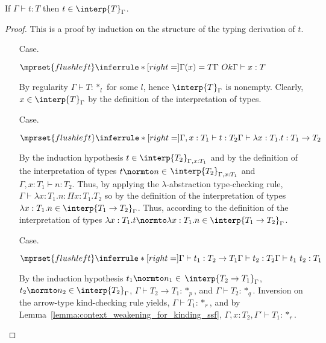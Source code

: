 \begin{thm}
  If $\Gamma \vdash t:T$ then $t \in \interp{T}_\Gamma$.
  \label{thm:soundness_ssf}
\end{thm}
\begin{proof}
  This is a proof by induction on the structure of the typing derivation of $t$.

\begin{itemize}
\item[Case.]\ \\
  \begin{center}
    \begin{math}
      $$\mprset{flushleft}
      \inferrule* [right=] {
        \Gamma(x) = T
        \\
        \Gamma\ Ok
      }{\Gamma \vdash x:T}
    \end{math}
  \end{center}
  By regularity $\Gamma \vdash T:*_l$ for some $l$, hence $\interp{T}_\Gamma$ is nonempty.
  Clearly, $x \in \interp{T}_\Gamma$ by the definition of the interpretation of types.
  
\item[Case.]\ \\
  \begin{center}
    \begin{math}
      $$\mprset{flushleft}
      \inferrule* [right=] {
        \Gamma,x:T_1 \vdash t:T_2
      }{\Gamma \vdash \lambda x:T_1.t : T_1 \rightarrow T_2}
    \end{math}
  \end{center}
  By the induction hypothesis $t \in
  \interp{T_2}_{\Gamma,x:T_1}$ and by the definition of the
  interpretation of types $t \normto n \in $ 
  $\interp{T_2}_{\Gamma,x:T_1}$ and $\Gamma, x:T_1 \vdash
  n:T_2$.  Thus, by applying the $\lambda$-abstraction type-checking
  rule, $\Gamma \vdash \lambda x:T_1.n:\Pi x:T_1.T_2$ so 
  by the definition of the interpretation of types $\lambda x:T_1.n
  \in \interp{T_1 \rightarrow T_2}_\Gamma$.  Thus, according to the
  definition of the interpretation of types $\lambda x:T_1.t
  \normto \lambda x:T_1.n \in \interp{T_1 \rightarrow T_2}_\Gamma$.

\item[Case.]\ \\
  \begin{center}
    \begin{math}
      $$\mprset{flushleft}
      \inferrule* [right=] {
        \Gamma \vdash t_1 : T_2 \rightarrow T_1 
        \\
        \Gamma \vdash t_2 : T_2
      }{\Gamma \vdash t_1\ t_2 : T_1}
    \end{math}
  \end{center}
  By the induction hypothesis $t_1 \normto n_1 \in $
  $\interp{T_2 \rightarrow T_1}_\Gamma$,
  $t_2 \normto n_2 \in \interp{T_2}_\Gamma$, $\Gamma \vdash T_2 \rightarrow T_1:*_p$, 
  and $\Gamma \vdash T_2:*_q$.  Inversion on the arrow-type kind-checking rule yields, 
  $\Gamma \vdash T_1:*_r$, and by
  Lemma~\ref{lemma:context_weakening_for_kinding_ssf}, 
  $\Gamma,x:T_2,\Gamma' \vdash T_1:*_r$.


\end{itemize}
\end{proof}
